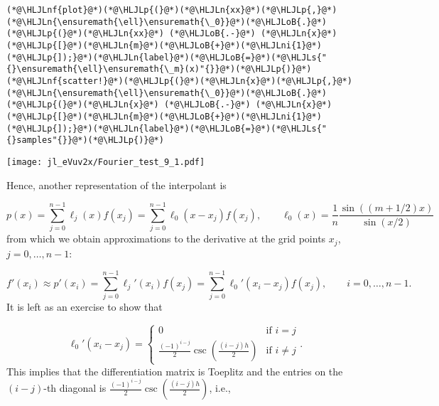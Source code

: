 \documentclass[12pt,a4paper]{article}
\newcommand{\HLJLn}[1]{#1}
\newcommand{\HLJLnf}[1]{\textcolor[RGB]{66,102,213}{#1}}
\newcommand{\HLJLs}[1]{\textcolor[RGB]{201,61,57}{#1}}
\newcommand{\HLJLni}[1]{\textcolor[RGB]{59,151,46}{#1}}
\newcommand{\HLJLoB}[1]{\textcolor[RGB]{102,102,102}{\textbf{#1}}}
\newcommand{\HLJLp}[1]{#1}
\begin{document}
\begin{lstlisting}
(*@\HLJLnf{plot}@*)(*@\HLJLp{(}@*)(*@\HLJLn{xx}@*)(*@\HLJLp{,}@*)(*@\HLJLn{\ensuremath{\ell}\ensuremath{\_0}}@*)(*@\HLJLoB{.}@*)(*@\HLJLp{(}@*)(*@\HLJLn{xx}@*) (*@\HLJLoB{.-}@*) (*@\HLJLn{x}@*)(*@\HLJLp{[}@*)(*@\HLJLn{m}@*)(*@\HLJLoB{+}@*)(*@\HLJLni{1}@*)(*@\HLJLp{]);}@*)(*@\HLJLn{label}@*)(*@\HLJLoB{=}@*)(*@\HLJLs{"{}\ensuremath{\ell}\ensuremath{\_m}(x)"{}}@*)(*@\HLJLp{)}@*)
(*@\HLJLnf{scatter!}@*)(*@\HLJLp{(}@*)(*@\HLJLn{x}@*)(*@\HLJLp{,}@*)(*@\HLJLn{\ensuremath{\ell}\ensuremath{\_0}}@*)(*@\HLJLoB{.}@*)(*@\HLJLp{(}@*)(*@\HLJLn{x}@*) (*@\HLJLoB{.-}@*) (*@\HLJLn{x}@*)(*@\HLJLp{[}@*)(*@\HLJLn{m}@*)(*@\HLJLoB{+}@*)(*@\HLJLni{1}@*)(*@\HLJLp{]);}@*)(*@\HLJLn{label}@*)(*@\HLJLoB{=}@*)(*@\HLJLs{"{}samples"{}}@*)(*@\HLJLp{)}@*)
\end{lstlisting}

\texttt{[image: jl\_eVuv2x/Fourier\_test\_9\_1.pdf]}

Hence, another representation of the interpolant is

\[
p(x) = \sum_{j=0}^{n-1}\ell_j(x)f(x_j) = \sum_{j=0}^{n-1}\ell_0(x-x_j)f(x_j), \qquad \ell_0(x) = \frac{1}{n}\frac{\sin((m+1/2)x)}{\sin(x/2)}
\]
from which we obtain approximations to the derivative at the grid points $x_j$, $j = 0, \ldots, n-1$:

\[
f'(x_i) \approx p'(x_i) = \sum_{j=0}^{n-1}\ell_{j}'(x_i) f(x_{j})  = \sum_{j=0}^{n-1}\ell_{0}'(x_i-x_j)f(x_{j}), \qquad i = 0, \ldots, n-1.
\]
It is left as an exercise to show that

\[
\ell_{0}'(x_i-x_j) = \begin{cases}
 0 & \text{if } i = j \\
 \frac{(-1)^{i-j}}{2}\csc\left( \frac{(i-j)h}{2} \right)  & \text{if } i\neq j
\end{cases}.
\]
This implies that the differentiation matrix is Toeplitz and the entries on the $(i-j)$-th diagonal is $\frac{(-1)^{i-j}}{2}\csc\left( \frac{(i-j)h}{2} \right)$, i.e.,
\end{document}
